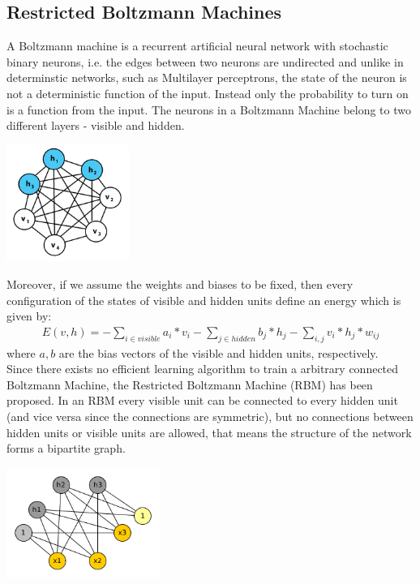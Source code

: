 \documentclass[a4paper]{scrartcl}
\begin{document}
\subsection{Restricted Boltzmann Machines}
A Boltzmann machine is a recurrent artificial neural network with stochastic binary neurons, i.e. the edges between two neurons are undirected and unlike in determinstic networks, such as Multilayer perceptrons, the state of the neuron is not a deterministic function of the input. Instead only the probability to turn on is a function from the input. The neurons in a Boltzmann Machine belong to two different layers - visible and hidden. 
\begin{center}
\includegraphics[width=4cm]{images/Boltzmannmachine.png}
\end{center}
Moreover, if we assume the weights and biases to be fixed, then every configuration of the states of visible and hidden units define an energy which is given by:
\begin{align}
E(v,h) = - \sum_{i \in visible} a_i*v_i - \sum_{j \in hidden} b_j*h_j - \sum_{i,j} v_i*h_j*w_{ij}
\end{align}
where $a, b$ are the bias vectors of the visible and hidden units, respectively. \\
Since there exists no efficient learning algorithm to train a arbitrary connected Boltzmann Machine, the Restricted Boltzmann Machine (RBM) has been proposed. In an RBM every visible unit can be connected to every hidden unit (and vice versa since the connections are symmetric), but no connections between hidden units or visible units are allowed, that means the structure of the network forms a bipartite graph.
\begin{center}
\includegraphics[width=5cm]{images/rbm2.png}
\end{center} 
\end{document}
